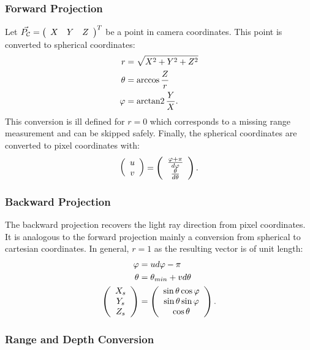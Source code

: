 \subsubsection*{Forward Projection}

Let $\vec{P_\mathcal{C}} = \left(\begin{array}{ccc} X & Y & Z \end{array}\right)^T$ be a point in camera coordinates.
This point is converted to spherical coordinates:
\begin{equation}
\begin{aligned}
    r       &= \sqrt{X^2 + Y^2 + Z^2} \\
    \theta  &= \arccos{\frac{Z}{r}} \\
    \varphi &= \operatorname{arctan2}{\frac{Y}{X}}\text{.}
\end{aligned}
\end{equation}
This conversion is ill defined for $r = 0$ which corresponds to a missing range measurement and can be skipped safely.
Finally, the spherical coordinates are converted to pixel coordinates with:
\begin{equation}
\begin{aligned} 
    \left(\begin{array}{c} u \\ v \end{array}\right) = \left(\begin{array}{c} \frac{\varphi + \pi}{d\varphi} \\ \frac{\theta}{d\theta} \end{array}\right)\text{.}
\end{aligned}
\end{equation}

\subsubsection*{Backward Projection}

The backward projection recovers the light ray direction from pixel coordinates.
It is analogous to the forward projection mainly a conversion from spherical to cartesian coordinates.
In general, $r = 1$ as the resulting vector is of unit length:
\begin{equation}
\begin{aligned}
    \varphi &= u d\varphi - \pi \\
    \theta &= \theta_{min} + v d\theta \\
    \left(\begin{array}{c} X_s \\ Y_s \\ Z_s \end{array}\right) &= \left(\begin{array}{c} \sin \theta \cos \varphi \\ \sin \theta \sin \varphi \\ \cos \theta \end{array}\right)\text{.}
\end{aligned}
\end{equation}

\subsubsection{Range and Depth Conversion}\label{sec:range_depth_conversion}

